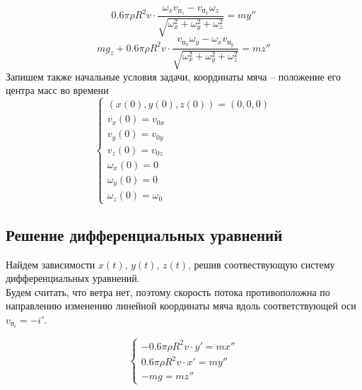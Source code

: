 \documentclass[a5paper, 10pt]{article}
\theoremstyle{definition}
\theoremstyle{plain}
\theoremstyle{remark}
\begin{document}
\begin{equation}
0.6 \pi \rho  R^{2} v  \cdot  \frac{ \omega _{x} v_{\text{п}_{z}} - v_{\text{п}_{x}} \omega _{z}}{ \sqrt{\omega _{x}^2+\omega _{y}^2+\omega _{z}^2}} = m y''
\end{equation}
\begin{equation}
m g_{z}+0.6 \pi \rho  R^{2} v  \cdot  \frac{v_{\text{п}_{x}} \omega _{y} - \omega _{x} v_{\text{п}_{y}} }{ \sqrt{\omega _{x}^2+\omega _{y}^2+\omega _{z}^2}} = m z''
\end{equation}
Запишем также начальные условия задачи, координаты мяча -- положение его центра масс во времени
\begin{equation}
\begin{cases}
\left(x (0), y(0), z(0) \right)  = \left(0, 0, 0\right)\\
v_{x} (0) = v_{0x}\\
v_{y} (0) = v_{0y}\\
v_{z} (0) = v_{0z}\\
\omega_{x} (0) = 0\\
\omega_{y} (0) = 0\\
\omega_{z} (0) = \omega_{0}
\end{cases}
\end{equation}
\subsection{Решение дифференциальных уравнений}
Найдем зависимости $x(t)$, $y(t)$, $z(t)$, решив соотвествующую систему дифференциальных уравнений.\\
Будем считать, что ветра нет, поэтому скорость потока противоположна по направлению изменению линейной координаты мяча вдоль соответствующей оси $v_{\text{п}_{i}} = -i'$.


\begin{equation}
\begin{cases}
- 0.6 \pi \rho  R^{2} v \cdot  y' = m x''\\
0.6 \pi \rho  R^{2} v \cdot   x'  = m y''\\
-m g  = m z''
\end{cases}
\end{equation}
\end{document}
